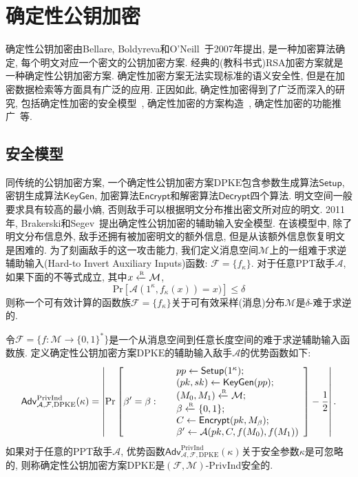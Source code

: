 \section{确定性公钥加密}

确定性公钥加密由Bellare, Boldyreva和O'Neill~\cite{BBO2007}于2007年提出, 是一种加密算法确定, 每个明文对应一个密文的公钥加密方案. 经典的(教科书式)RSA加密方案就是一种确定性公钥加密方案. 确定性加密方案无法实现标准的语义安全性, 但是在加密数据检索等方面具有广泛的应用. 正因如此, 确定性加密得到了广泛而深入的研究, 包括确定性加密的安全模型~\cite{BFO2008,BS-JOC-2014}, 确定性加密的方案构造~\cite{Wee-EUROCRYPT-2012,FOR2012,FOR-JOC-2015}, 确定性加密的功能推广~\cite{XXZ2012,ZFLW-IWSEC-2017}等.

\subsection{安全模型}
同传统的公钥加密方案, 一个确定性公钥加密方案$\text{DPKE}$包含参数生成算法$\mathsf{Setup}$, 密钥生成算法$\mathsf{KeyGen}$, 加密算法$\mathsf{Encrypt}$和解密算法$\mathsf{Decrypt}$四个算法. 明文空间一般要求具有较高的最小熵, 否则敌手可以根据明文分布推出密文所对应的明文. 2011年, Brakerski和Segev~\cite{BS2011}提出确定性公钥加密的辅助输入安全模型. 在该模型中, 除了明文分布信息外, 敌手还拥有被加密明文的额外信息, 但是从该额外信息恢复明文是困难的. 为了刻画敌手的这一攻击能力, 我们定义消息空间$\mathcal{M}$上的一组难于求逆辅助输入(Hard-to Invert Auxiliary Inputs)函数: $\mathcal{F}=\{f_{\kappa}\}$. 对于任意PPT敌手$\mathcal{A}$, 如果下面的不等式成立, 其中$x \xleftarrow{\textup{\tiny R}} \mathcal{M}$, 
\[
\text{Pr}\left[\mathcal{A}(1^\kappa, f_\kappa(x)) = x)\right] \leq \delta
\]
则称一个可有效计算的函数族$\mathcal{F}=\{f_{\kappa}\}$关于可有效采样(消息)分布$\mathcal{M}$是$\delta$-难于求逆的.

\begin{definition} [辅助输入安全性]
令$\mathcal{F} = \{f: \mathcal{M} \rightarrow \{0, 1\}^*\}$是一个从消息空间到任意长度空间的难于求逆辅助输入函数族. 定义确定性公钥加密方案$\text{DPKE}$的辅助输入敌手$\mathcal{A}$的优势函数如下: 
\begin{displaymath}
	\mathsf{Adv}_{\mathcal{A}, \mathcal{F}, \text{DPKE}}^{\text{PrivInd}}(\kappa) = \left| \Pr \left[ \beta' = \beta:~
	\begin{array}{ll}
		& pp \leftarrow \mathsf{Setup}(1^\kappa); \\		
		& (pk, sk) \leftarrow \mathsf{KeyGen}(pp);\\
		& (M_0, M_1) \xleftarrow{\textup{\tiny R}} \mathcal{M}; \\
		& \beta \xleftarrow{\textup{\tiny R}} \{0,1\};\\ 
		& C \leftarrow \mathsf{Encrypt}(pk, M_\beta); \\
		& \beta' \leftarrow \mathcal{A}(pk, C, f(M_0), f(M_1)) 
	\end{array} 
\right] - \frac{1}{2} \right|.
\end{displaymath}
如果对于任意的PPT敌手$\mathcal{A}$, 优势函数$\mathsf{Adv}_{\mathcal{A}, \mathcal{F}, \text{DPKE}}^{\text{PrivInd}}(\kappa)$关于安全参数$\kappa$是可忽略的, 则称确定性公钥加密方案$\text{DPKE}$是$(\mathcal{F}, \mathcal{M})$-PrivInd安全的.
\end{definition}

